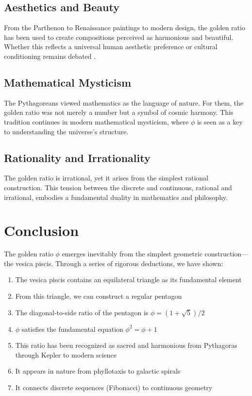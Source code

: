 \subsection{Aesthetics and Beauty}

From the Parthenon to Renaissance paintings to modern design, the golden ratio has been used to create compositions perceived as harmonious and beautiful. Whether this reflects a universal human aesthetic preference or cultural conditioning remains debated \cite{cox_golden_ratio}.

\subsection{Mathematical Mysticism}

The Pythagoreans viewed mathematics as the language of nature. For them, the golden ratio was not merely a number but a symbol of cosmic harmony. This tradition continues in modern mathematical mysticism, where $\phi$ is seen as a key to understanding the universe's structure.

\subsection{Rationality and Irrationality}

The golden ratio is irrational, yet it arises from the simplest rational construction. This tension between the discrete and continuous, rational and irrational, embodies a fundamental duality in mathematics and philosophy.

\section{Conclusion}

The golden ratio $\phi$ emerges inevitably from the simplest geometric construction—the vesica piscis. Through a series of rigorous deductions, we have shown:

\begin{enumerate}
    \item The vesica piscis contains an equilateral triangle as its fundamental element
    \item From this triangle, we can construct a regular pentagon
    \item The diagonal-to-side ratio of the pentagon is $\phi = (1+\sqrt{5})/2$
    \item $\phi$ satisfies the fundamental equation $\phi^2 = \phi + 1$
    \item This ratio has been recognized as sacred and harmonious from Pythagoras through Kepler to modern science
    \item It appears in nature from phyllotaxis to galactic spirals
    \item It connects discrete sequences (Fibonacci) to continuous geometry
\end{enumerate}

